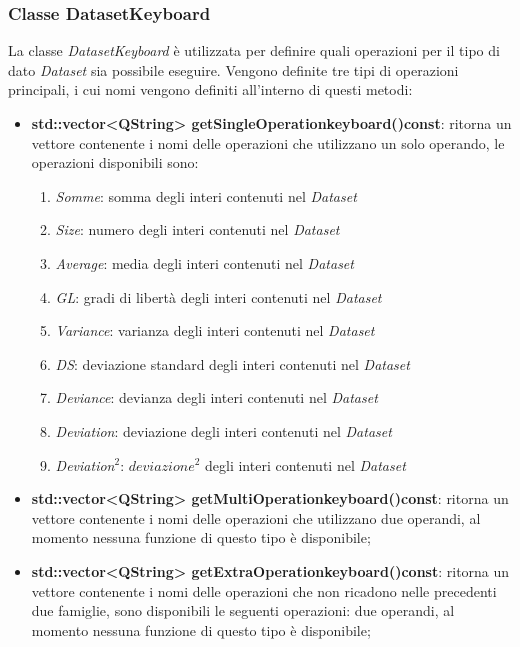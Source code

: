 \documentclass[a4paper,10pt]{article}
\begin{document}
    \subsubsection{Classe DatasetKeyboard}
    La classe \textit{DatasetKeyboard} è utilizzata per definire quali operazioni per il tipo di dato \textit{Dataset} sia possibile eseguire.
    Vengono definite tre tipi di operazioni principali, i cui nomi vengono definiti all'interno di questi metodi:
    \begin{itemize}
        \item \textbf{std::vector<QString> getSingleOperationkeyboard()const}: ritorna un vettore contenente i nomi delle operazioni che utilizzano un solo operando, le operazioni disponibili sono:
        \begin{enumerate}
            \item \textit{Somme}: somma degli interi contenuti nel \textit{Dataset}
            \item \textit{Size}: numero degli interi contenuti nel \textit{Dataset}
            \item \textit{Average}: media degli interi contenuti nel \textit{Dataset}
            \item \textit{GL}: gradi di libertà degli interi contenuti nel \textit{Dataset}
            \item \textit{Variance}: varianza degli interi contenuti nel \textit{Dataset}
            \item \textit{DS}: deviazione standard degli interi contenuti nel \textit{Dataset}
            \item \textit{Deviance}: devianza degli interi contenuti nel \textit{Dataset}
            \item \textit{Deviation}: deviazione degli interi contenuti nel \textit{Dataset}
            \item \textit{Deviation$^2$}: $deviazione^{2}$ degli interi contenuti nel \textit{Dataset}
        \end{enumerate}
        \item \textbf{std::vector<QString> getMultiOperationkeyboard()const}: ritorna un vettore contenente i nomi delle operazioni che utilizzano due operandi, al momento nessuna funzione di questo tipo è disponibile;
        \item \textbf{std::vector<QString> getExtraOperationkeyboard()const}: ritorna un vettore contenente i nomi delle operazioni che non ricadono nelle precedenti due famiglie, sono disponibili le seguenti operazioni:
        due operandi, al momento nessuna funzione di questo tipo è disponibile;
    \end{itemize}
\end{document}
